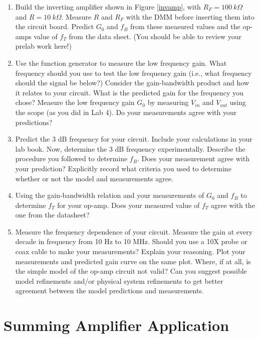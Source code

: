 \documentclass[10pt]{PhysLab1C} %
\begin{document}
\begin{enumerate}
\def\labelenumi{\arabic{enumi}.}
\item
  Build the inverting amplifier shown in Figure \ref{invamp}, with \(R_F = 100 ~k\Omega\)
  and \(R = 10 ~k\Omega\). Measure \(R\) and \(R_F\) with the DMM before
  inserting them into the circuit board. Predict \(G_0\) and \(f_B\)
  from these measured values and the op-amp\textquotesingle s value of
  \(f_T\) from the data sheet. (You should be able to review your
  prelab work here!)
\item
  Use the function generator to measure the low frequency gain. What
  frequency should you use to test the low frequency gain (i.e., what
  frequency should the signal be below?) Consider the gain-bandwidth
  product and how it relates to your circuit. What is the predicted gain
  for the frequency you chose? Measure the low frequency gain \(G_0\) by
  measuring \(V_{in}\) and \(V_{out}\) using the scope (as you did in
  Lab 4). Do your measurements agree with your predictions?
\item
  Predict the 3 dB frequency for your circuit. Include your calculations
  in your lab book. Now, determine the 3 dB frequency experimentally.
  Describe the procedure you followed to determine \(f_B\). Does your
  measurement agree with your prediction? Explicitly record what
  criteria you used to determine whether or not the model and
  measurements agree.
\item
  Using the gain-bandwidth relation and your measurements of \(G_0\) and
  \(f_B\) to determine \(f_T\) for your op-amp. Does your measured value
  of \(f_T\) agree with the one from the datasheet?
\item
  Measure the frequency dependence of your circuit. Measure the gain at
  every decade in frequency from 10 Hz to 10 MHz. Should you use a 10X
  probe or coax cable to make your measurements? Explain your reasoning.
  Plot your measurements and predicted gain curve on the same plot.
  Where, if at all, is the simple model of the op-amp circuit not valid?
  Can you suggest possible model refinements and/or physical system
  refinements to get better agreement between the model predictions and
  measurements.
\end{enumerate}


\section{Summing Amplifier Application}
\end{document}
